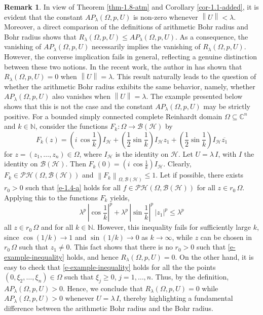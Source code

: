 \documentclass[a4paper,11pt, reqno]{amsart}
\theoremstyle{definition}
\newtheorem{rem}{Remark}[section]
\newcounter {own}
\newcommand{\norm}[1]{\left\lVert#1\right\rVert}
\begin{document}
	\begin{rem}
	In view of Theorem \ref{thm-1.8-atm} and Corollary \ref{cor-1.1-added}, it is evident that the constant $AP_\lambda(\Omega,p,U)$ is non-zero whenever $\norm{U}<\lambda$. Moreover, a direct comparison of the definitions of arithmetic Bohr radius and Bohr radius shows that $R_\lambda(\Omega,p,U)\leq AP_\lambda(\Omega,p,U)$. As a consequence, the vanishing of $AP_\lambda(\Omega,p,U)$ necessarily implies the vanishing of $R_\lambda(\Omega,p,U)$. However, the converse implication fails in general, reflecting a genuine distinction between these two notions. In the recent work, the author in \cite{Himadri-local-Banach-1} has shown that $R_\lambda(\Omega,p,U)=0$ when $\norm{U}=\lambda$. This result naturally leads to the question of whether the arithmetic Bohr radius exhibits the same behavior, namely, whether $AP_\lambda(\Omega,p,U)$ also vanishes when $\norm{U}=\lambda$. The example presented below shows that this is not the case and the constant $AP_{\lambda}(\Omega, p,U)$ may be strictly positive. 
		For a bounded simply connected complete Reinhardt domain $\Omega \subseteq \mathbb{C}^n$ and $k \in \mathbb{N}$, consider the functions  
		$F_{k}: \Omega \rightarrow \mathcal{B}(\mathcal{H})$ by $$F_{k}(z)=(i\, \cos \frac{1}{k}) I_{\mathcal{H}} + (\frac{1}{2} \sin \frac{1}{k})  I_{\mathcal{H}}z_{1}+(\frac{1}{2} \sin \frac{1}{k})  I_{\mathcal{H}} \overline{z_{1}}$$
		for $z=(z_{1}, \ldots,z_{n}) \in \Omega$, where $I_{\mathcal{H}}$ is the identity on $\mathcal{H}$. Let $U=\lambda \, I$, with $I$ the identity on $\mathcal{B}(\mathcal{H})$. Then $F_{k}(0)=(i\, \cos \frac{1}{k})  I_{\mathcal{H}}$. Clearly, $F_{k} \in \mathcal{PH}(\Omega,\mathcal{B}(\mathcal{H}))$ and $\norm{F_{k}}_{\Omega,\mathcal{B}(\mathcal{H})} \leq 1$. Let if possible, there exists $r_{0}>0$ such that \eqref{e-1.4-a} holds for all $f \in \mathcal{PH}(\Omega,\mathcal{B}(\mathcal{H}))$ for all $z \in r_{0}\, \Omega$. Applying this to the functions $F_{k}$ yields, 
		\begin{equation} \label{e-example-inequality}
		\lambda^p \, |\cos \frac{1}{k}|^p + \lambda^p \, |\sin \frac{1}{k}|^p\, |z_{1}|^p \leq \lambda^p
		\end{equation}
		all $z \in r_{0}\, \Omega$ and for all $k \in \mathbb{N}$. However, this inequality fails for sufficiently large $k$, since $\cos (1/k) \rightarrow 1$ and $\sin(1/k) \rightarrow 0$ as $k \rightarrow\infty$, while $z$
		can be chosen in $r_{0}\, \Omega$ such that $z_{1} \neq 0$. This fact shows that there is no $r_{0}>0$ such that \eqref{e-example-inequality} holds, and hence $R_\lambda(\Omega,p,U)=0$. On the other hand, it is easy to check that \eqref{e-example-inequality} holds for all the the points $(0,\xi_2, \ldots, \xi_n) \in \Omega$ such that $\xi_j \geq 0$, $j=1,\ldots,n$. Thus, by the definition, $AP_\lambda(\Omega,p,U)>0$. Hence, we conclude that $R_\lambda(\Omega,p,U)=0$ while $AP_\lambda(\Omega,p,U)>0$ whenever $U=\lambda\, I$, thereby highlighting a fundamental difference between the arithmetic Bohr radius and the Bohr radius.
	\end{rem}
\end{document}

